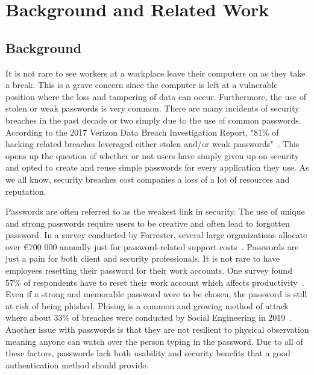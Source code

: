 \documentclass[letterpaper,twocolumn,10pt]{article}
\begin{document}

\section{Background and Related Work}  

\subsection{Background}

It is not rare to see workers at a workplace leave their computers on as they take a break. This is a grave concern since the computer is left at a vulnerable position where the loss and tampering of data can occur. Furthermore, the use of stolen or weak passwords is very common. There are many incidents of security breaches in the past decade or two simply due to the use of common passwords. According to the 2017 Verizon Data Breach Investigation Report, "81\% of hacking related breaches leveraged either stolen and/or weak passwords"\nocite{*}~\cite{verizon_breach}. This opens up the question of whether or not users have simply given up on security and opted to create and reuse simple passwords for every application they use. As we all know, security breaches cost companies a loss of a lot of resources and reputation.

Passwords are often referred to as the weakest link in security. The use of unique and strong passwords require users to be creative and often lead to forgotten password. In a survey conducted by Forrester, several large organizations allocate over \euro{700 000} annually just for password-related support costs~\cite{password_cost}. Passwords are just a pain for both client and security professionals. It is not rare to have employees resetting their password for their work accounts. One survey found 57\% of respondents have to reset their work account which affects productivity~\cite{password_reset}. Even if a strong and memorable password were to be chosen, the password is still at risk of being phished. Phising is a common and growing method of attack where about 33\% of breaches were conducted by Social Engineering in 2019~\cite{verizon_breach2}. Another issue with passwords is that they are not resilient to physical observation meaning anyone can watch over the person typing in the password. Due to all of these factors, passwords lack both usability and security benefits that a good authentication method should provide.
\end{document}
